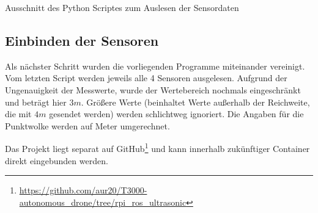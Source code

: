 \begin{listing}[!ht]
    \caption{Ausschnitt des Python Scriptes zum Auslesen der Sensordaten}
    \label{listing:ultra_rpi_impl_i2c}
\end{listing}

\subsection{Einbinden der Sensoren}
Als nächster Schritt wurden die vorliegenden Programme miteinander vereinigt.
Vom letzten Script werden jeweils alle 4 Sensoren ausgelesen. Aufgrund der Ungenauigkeit der Messwerte, wurde der Wertebereich nochmals eingeschränkt und beträgt hier $3m$. Größere Werte (beinhaltet Werte außerhalb der Reichweite, die mit $4m$ gesendet werden) werden schlichtweg ignoriert. Die Angaben für die Punktwolke werden auf Meter umgerechnet.

Das Projekt liegt separat auf GitHub\footnote{\url{https://github.com/aur20/T3000-autonomous_drone/tree/rpi_ros_ultrasonic}} und kann innerhalb zukünftiger Container direkt eingebunden werden.
